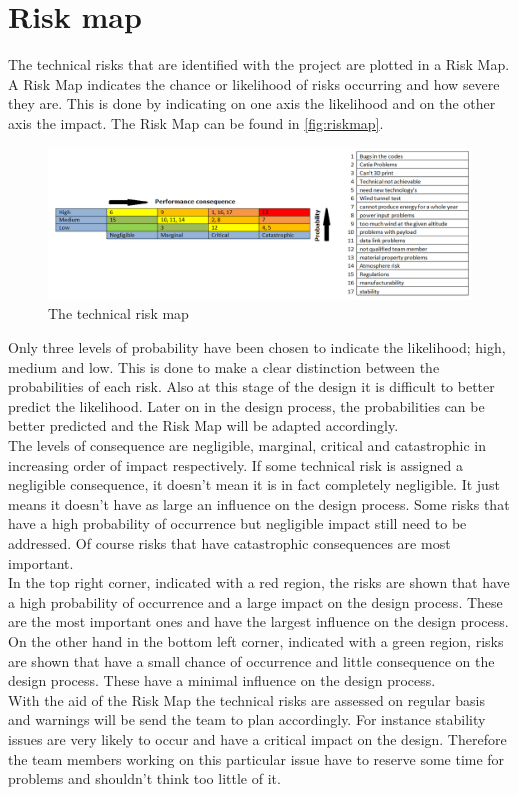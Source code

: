 \documentclass[a4paper]{report}
\begin{document}
\section{Risk map}
The technical risks that are identified with the project are plotted in a Risk Map. A Risk Map indicates the chance or likelihood of risks occurring and how severe they are. This is done by indicating on one axis the likelihood  and on the other axis the impact. The Risk Map can be found in \autoref{fig:riskmap}. \\
\begin{figure}[H]
\label{fig:riskmap}
\centering
\includegraphics[width=\textwidth]{Figures/riskmap.png}
\caption{The technical risk map }
\end{figure}

Only three levels of probability have been chosen to indicate the likelihood; high, medium and low. This is done to make a clear distinction between the probabilities of each risk. Also at this stage of the design it is difficult to better predict the likelihood. Later on in the design process, the probabilities can be better predicted and the Risk Map will be adapted accordingly. \\
The levels of consequence are negligible, marginal, critical and catastrophic in increasing order of impact respectively. If some technical risk is assigned a negligible consequence, it doesn't mean it is in fact completely negligible. It just means it doesn't have as large an influence on the design process. Some risks that have a high probability of occurrence but negligible impact still need to be addressed. Of course risks that have catastrophic consequences are most important. \\
In the top right corner, indicated with a red region, the risks are shown that have a high probability of occurrence and a large impact on the design process. These are the most important ones and have the largest influence on the design process. On the other hand in the bottom left corner, indicated with a green region, risks are shown that have a small chance of occurrence and little consequence on the design process. These have a minimal influence on the design process. \\
With the aid of the Risk Map the technical risks are assessed on regular basis and warnings will be send the team to plan accordingly. For instance stability issues are very likely to occur and have a critical impact on the design. Therefore the team members working on this particular issue have to reserve some time for problems and shouldn't think too little of it. \\
\end{document}
